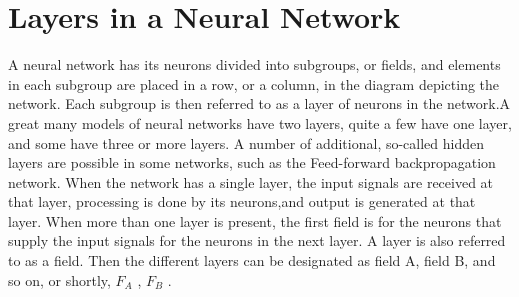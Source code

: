 \documentclass[12pt, right open]{memoir}
\begin{document}
\section{Layers in a Neural Network}
A neural network has its neurons divided into subgroups, or fields, and
elements in each subgroup are placed in a row, or a column, in the diagram
depicting the network. Each subgroup is then referred to as a layer of neurons
in the network.A great many models of neural networks have two layers, quite
a few have one layer, and some have three or more layers. A number of
additional, so-called hidden layers are possible in some networks, such as the
Feed-forward backpropagation network. When the network has a single layer,
the input signals are received at that layer, processing is done by its neurons,and output is generated at that layer. When more than one layer is present, the
first field is for the neurons that supply the input signals for the neurons in the
next layer.
A layer is also referred to as a field. Then the different layers can be designated
as field A, field B, and so on, or shortly, $F_A$ , $F_B$ .
\end{document}
